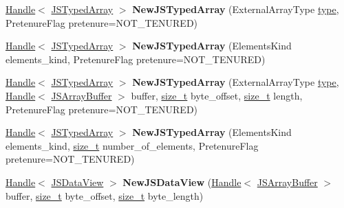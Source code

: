\begin{DoxyCompactItemize}
\item 
\mbox{\label{classv8_1_1internal_1_1Factory_a151ae6add71235e86137e97819da435e}} 
\mbox{\hyperlink{classv8_1_1internal_1_1Handle}{Handle}}$<$ \mbox{\hyperlink{classv8_1_1internal_1_1JSTypedArray}{J\+S\+Typed\+Array}} $>$ {\bfseries New\+J\+S\+Typed\+Array} (External\+Array\+Type \mbox{\hyperlink{classstd_1_1conditional_1_1type}{type}}, Pretenure\+Flag pretenure=N\+O\+T\+\_\+\+T\+E\+N\+U\+R\+ED)
\item 
\mbox{\label{classv8_1_1internal_1_1Factory_a6a04ec0bf00ca88aeb62be7200bdbf29}} 
\mbox{\hyperlink{classv8_1_1internal_1_1Handle}{Handle}}$<$ \mbox{\hyperlink{classv8_1_1internal_1_1JSTypedArray}{J\+S\+Typed\+Array}} $>$ {\bfseries New\+J\+S\+Typed\+Array} (Elements\+Kind elements\+\_\+kind, Pretenure\+Flag pretenure=N\+O\+T\+\_\+\+T\+E\+N\+U\+R\+ED)
\item 
\mbox{\label{classv8_1_1internal_1_1Factory_aba0d2eca3d7a5b616d97cbb8bfa800cb}} 
\mbox{\hyperlink{classv8_1_1internal_1_1Handle}{Handle}}$<$ \mbox{\hyperlink{classv8_1_1internal_1_1JSTypedArray}{J\+S\+Typed\+Array}} $>$ {\bfseries New\+J\+S\+Typed\+Array} (External\+Array\+Type \mbox{\hyperlink{classstd_1_1conditional_1_1type}{type}}, \mbox{\hyperlink{classv8_1_1internal_1_1Handle}{Handle}}$<$ \mbox{\hyperlink{classv8_1_1internal_1_1JSArrayBuffer}{J\+S\+Array\+Buffer}} $>$ buffer, \mbox{\hyperlink{classsize__t}{size\+\_\+t}} byte\+\_\+offset, \mbox{\hyperlink{classsize__t}{size\+\_\+t}} length, Pretenure\+Flag pretenure=N\+O\+T\+\_\+\+T\+E\+N\+U\+R\+ED)
\item 
\mbox{\label{classv8_1_1internal_1_1Factory_ac0407f494897bae5f8b2652eb267cc62}} 
\mbox{\hyperlink{classv8_1_1internal_1_1Handle}{Handle}}$<$ \mbox{\hyperlink{classv8_1_1internal_1_1JSTypedArray}{J\+S\+Typed\+Array}} $>$ {\bfseries New\+J\+S\+Typed\+Array} (Elements\+Kind elements\+\_\+kind, \mbox{\hyperlink{classsize__t}{size\+\_\+t}} number\+\_\+of\+\_\+elements, Pretenure\+Flag pretenure=N\+O\+T\+\_\+\+T\+E\+N\+U\+R\+ED)
\item 
\mbox{\label{classv8_1_1internal_1_1Factory_aa5aaf8227d0f138b5382d467394ac826}} 
\mbox{\hyperlink{classv8_1_1internal_1_1Handle}{Handle}}$<$ \mbox{\hyperlink{classv8_1_1internal_1_1JSDataView}{J\+S\+Data\+View}} $>$ {\bfseries New\+J\+S\+Data\+View} (\mbox{\hyperlink{classv8_1_1internal_1_1Handle}{Handle}}$<$ \mbox{\hyperlink{classv8_1_1internal_1_1JSArrayBuffer}{J\+S\+Array\+Buffer}} $>$ buffer, \mbox{\hyperlink{classsize__t}{size\+\_\+t}} byte\+\_\+offset, \mbox{\hyperlink{classsize__t}{size\+\_\+t}} byte\+\_\+length)

\end{DoxyCompactItemize}

